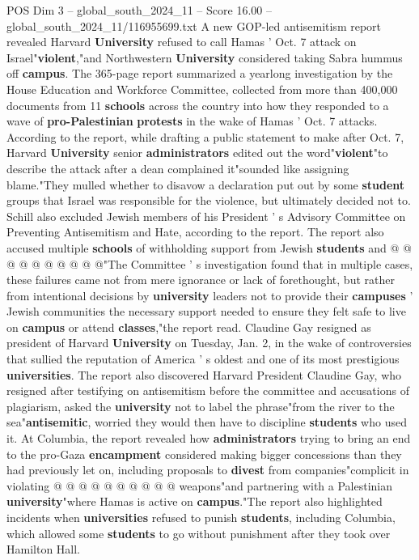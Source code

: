 \begin{textsample}{POS Dim 3 – global\_south\_2024\_11 – Score 16.00 – global\_south\_2024\_11/116955699.txt}  \label{ex:f3_pos_318}
A new GOP-led antisemitism report revealed Harvard \textbf{University} refused to call Hamas ' Oct. 7 attack on Israel"\textbf{violent},"and Northwestern \textbf{University} considered taking Sabra hummus off \textbf{campus}.
The 365-page report summarized a yearlong investigation by the House Education and Workforce Committee, collected from more than 400,000 documents from 11 \textbf{schools} across the country into how they responded to a wave of \textbf{pro-Palestinian} \textbf{protests} in the wake of Hamas ' Oct. 7 attacks.
According to the report, while drafting a public statement to make after Oct. 7, Harvard \textbf{University} senior \textbf{administrators} edited out the word"\textbf{violent}"to describe the attack after a dean complained it"sounded like assigning blame."They mulled whether to disavow a declaration put out by some \textbf{student} groups that Israel was responsible for the violence, but ultimately decided not to.
Schill also excluded Jewish members of his President ' s Advisory Committee on Preventing Antisemitism and Hate, according to the report.
The report also accused multiple \textbf{schools} of withholding support from Jewish \textbf{students} and @ @ @ @ @ @ @ @ @ @"The Committee ' s investigation found that in multiple cases, these failures came not from mere ignorance or lack of forethought, but rather from intentional decisions by \textbf{university} leaders not to provide their \textbf{campuses} ' Jewish communities the necessary support needed to ensure they felt safe to live on \textbf{campus} or attend \textbf{classes},"the report read.
Claudine Gay resigned as president of Harvard \textbf{University} on Tuesday, Jan. 2, in the wake of controversies that sullied the reputation of America ' s oldest and one of its most prestigious \textbf{universities}.
The report also discovered Harvard President Claudine Gay, who resigned after testifying on antisemitism before the committee and accusations of plagiarism, asked the \textbf{university} not to label the phrase"from the river to the sea"\textbf{antisemitic}, worried they would then have to discipline \textbf{students} who used it.
At Columbia, the report revealed how \textbf{administrators} trying to bring an end to the pro-Gaza \textbf{encampment} considered making bigger concessions than they had previously let on, including proposals to \textbf{divest} from companies"complicit in violating @ @ @ @ @ @ @ @ @ @ weapons"and partnering with a Palestinian \textbf{university}"where Hamas is active on \textbf{campus}."The report also highlighted incidents when \textbf{universities} refused to punish \textbf{students}, including Columbia, which allowed some \textbf{students} to go without punishment after they took over Hamilton Hall.

\end{textsample}
